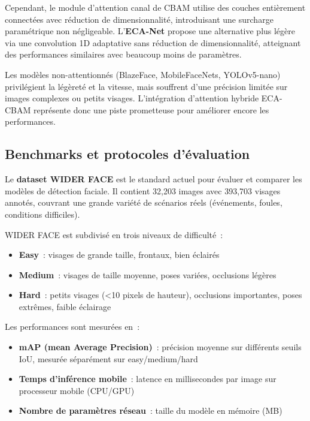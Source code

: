 \begin{onehalfspace}
\hspace{0.65 cm}Cependant, le module d'attention canal de CBAM utilise des couches entièrement connectées avec réduction de dimensionnalité, introduisant une surcharge paramétrique non négligeable. L'\textbf{ECA-Net} \cite{Wang2020ECANet} propose une alternative plus légère via une convolution 1D adaptative sans réduction de dimensionnalité, atteignant des performances similaires avec beaucoup moins de paramètres.

\hspace{0.65 cm}Les modèles non-attentionnés (BlazeFace, MobileFaceNets, YOLOv5-nano) privilégient la légèreté et la vitesse, mais souffrent d'une précision limitée sur images complexes ou petits visages. L'intégration d'attention hybride ECA-CBAM représente donc une piste prometteuse pour améliorer encore les performances.

\subsection{Benchmarks et protocoles d'évaluation}

\hspace{0.65 cm}Le \textbf{dataset WIDER FACE} \cite{Yang2016WIDERFACE} est le standard actuel pour évaluer et comparer les modèles de détection faciale. Il contient 32,203 images avec 393,703 visages annotés, couvrant une grande variété de scénarios réels (événements, foules, conditions difficiles).

\hspace{0.65 cm}WIDER FACE est subdivisé en trois niveaux de difficulté~:
\begin{itemize}
\item \textbf{Easy}~: visages de grande taille, frontaux, bien éclairés
\item \textbf{Medium}~: visages de taille moyenne, poses variées, occlusions légères
\item \textbf{Hard}~: petits visages (<10 pixels de hauteur), occlusions importantes, poses extrêmes, faible éclairage
\end{itemize}

\hspace{0.65 cm}Les performances sont mesurées en~:
\begin{itemize}
\item \textbf{mAP (mean Average Precision)}~: précision moyenne sur différents seuils IoU, mesurée séparément sur easy/medium/hard
\item \textbf{Temps d'inférence mobile}~: latence en millisecondes par image sur processeur mobile (CPU/GPU)
\item \textbf{Nombre de paramètres réseau}~: taille du modèle en mémoire (MB)
\end{itemize}


\end{onehalfspace}
